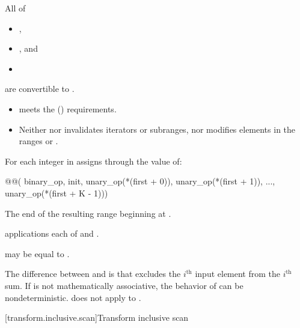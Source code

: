 \begin{itemdescr}
\pnum
\mandates
  All of
  \begin{itemize}
  \item {},
  \item {}, and
  \item {}
  \end{itemize}
  are convertible to .

\pnum
\expects
\begin{itemize}
\item
   meets the  () requirements.
\item
  Neither  nor 
  invalidates iterators or subranges, nor modifies elements in
  the ranges  or .
\end{itemize}

\pnum
\effects
For each integer  in 
assigns through  the value of:
\begin{codeblock}
@@(
    binary_op, init,
    unary_op(*(first + 0)), unary_op(*(first + 1)), ..., unary_op(*(first + K - 1)))
\end{codeblock}

\pnum
\returns
The end of the resulting range beginning at .

\pnum
\complexity
{} applications each
of  and .

\pnum
\remarks
{} may be equal to .

\pnum
\begin{note}
The difference between  and
 is that 
excludes the $i^\text{th}$ input element from the $i^\text{th}$ sum.
If  is not mathematically associative,
the behavior of  can be nondeterministic.
does not apply  to .
\end{note}
\end{itemdescr}

[transform.inclusive.scan]{Transform inclusive scan}

